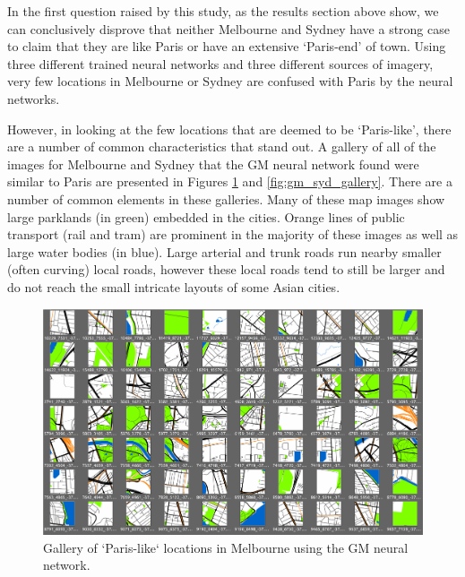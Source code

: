 \documentclass[sageh,times]{sagej}
\begin{document}
In the first question raised by this study, as the results section above show, we can conclusively disprove that neither Melbourne and Sydney have a strong case to claim that they are like Paris or have an extensive `Paris-end' of town. Using three different trained neural networks and three different sources of imagery, very few locations in Melbourne or Sydney are confused with Paris by the neural networks. 

However, in looking at the few locations that are deemed to be `Paris-like', there are a number of common characteristics that stand out. A gallery of all of the images for Melbourne and Sydney that the GM neural network found were similar to Paris are presented in Figures \ref{fig:gm_mel_gallery} and \ref{fig:gm_syd_gallery}. There are a number of common elements in these galleries. Many of these map images show large parklands (in green) embedded in the cities. Orange lines of public transport (rail and tram) are prominent in the majority of these images as well as large water bodies (in blue). Large arterial and trunk roads run nearby smaller (often curving) local roads, however these local roads tend to still be larger and do not reach the small intricate layouts of some Asian cities.

 \begin{figure}[!htbp]
 \centering    
 \includegraphics[scale=0.50]{Images/MelbourneLikeParis/Melbourne_maps_gallery.png} 
 \caption{Gallery of `Paris-like` locations in Melbourne using the GM neural network.}    
  \label{fig:gm_mel_gallery}  
 \end{figure} 
\end{document}
